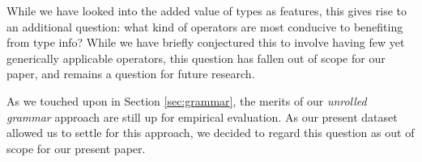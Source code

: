 \documentclass{article}
\begin{document}
    While we have looked into the added value of types as features,
    this gives rise to an additional question:
    what kind of operators are most conducive to benefiting from type info?
    While we have briefly conjectured this to involve having few yet generically applicable operators,
    this question has fallen out of scope for our paper,
    and remains a question for future research.



    As we touched upon in Section \ref{sec:grammar},
    the merits of our \emph{unrolled grammar} approach are still up for empirical evaluation.
    As our present dataset allowed us to settle for this approach,
    we decided to regard this question as out of scope for our present paper.

\end{document}
